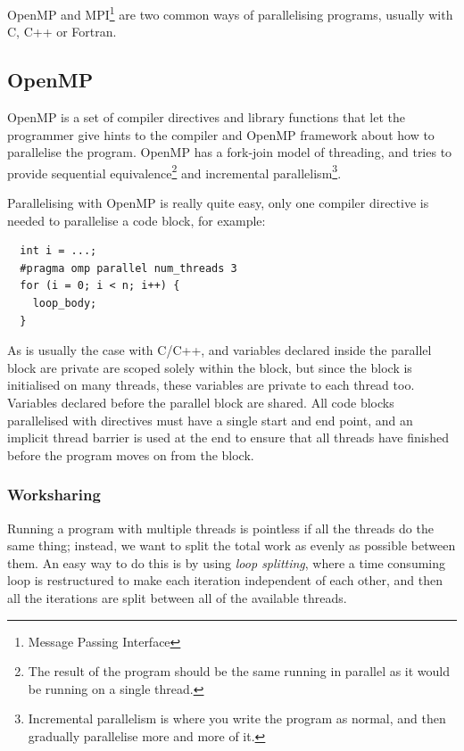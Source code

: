 OpenMP and MPI\footnote{Message Passing Interface} are two common ways
of parallelising programs, usually with C, C++ or Fortran.

\subsection{OpenMP}

OpenMP is a set of compiler directives and library functions that let
the programmer give hints to the compiler and OpenMP framework about
how to parallelise the program. OpenMP has a fork-join model of
threading, and tries to provide sequential equivalence\footnote{The
result of the program should be the same running in parallel as it
would be running on a single thread.} and incremental
parallelism\footnote{Incremental parallelism is where you write the
program as normal, and then gradually parallelise more and more of
it.}.

Parallelising with OpenMP is really quite easy, only one compiler
directive is needed to parallelise a code block, for example:

\begin{verbatim}
  int i = ...;
  #pragma omp parallel num_threads 3
  for (i = 0; i < n; i++) {
    loop_body;
  }
\end{verbatim}

As is usually the case with C/C++, and variables declared inside the
parallel block are private are scoped solely within the block, but
since the block is initialised on many threads, these variables are
private to each thread too. Variables declared before the parallel
block are shared. All code blocks parallelised with directives must
have a single start and end point, and an implicit thread barrier is
used at the end to ensure that all threads have finished before the
program moves on from the block.

\subsubsection{Worksharing}


Running a program with multiple threads is pointless if all the
threads do the same thing; instead, we want to split the total work as
evenly as possible between them. An easy way to do this is by
using \textit{loop splitting}, where a time consuming loop is
restructured to make each iteration independent of each other, and
then all the iterations are split between all of the available threads.

